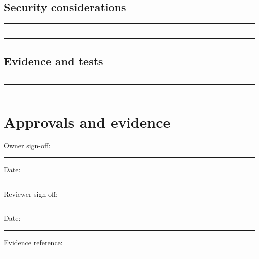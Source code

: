 \documentclass[11pt]{article}
\begin{document}
\subsection{Security considerations}
\noindent\rule{\linewidth}{0.3pt}\par\vspace{0.18in}
\noindent\rule{\linewidth}{0.3pt}\par\vspace{0.18in}
\noindent\rule{\linewidth}{0.3pt}\par\vspace{0.14in}

\subsection{Evidence and tests}
\noindent\rule{\linewidth}{0.3pt}\par\vspace{0.18in}
\noindent\rule{\linewidth}{0.3pt}\par\vspace{0.18in}
\noindent\rule{\linewidth}{0.3pt}\par\vspace{0.14in}

\section{Approvals and evidence}
\noindent Owner sign-off: \rule{0.42\linewidth}{0.4pt}\hfill Date: \rule{0.19\linewidth}{0.4pt}\par\vspace{0.4cm}
\noindent Reviewer sign-off: \rule{0.40\linewidth}{0.4pt}\hfill Date: \rule{0.19\linewidth}{0.4pt}\par\vspace{0.4cm}
\noindent Evidence reference: \rule{0.70\linewidth}{0.4pt}
\end{document}
